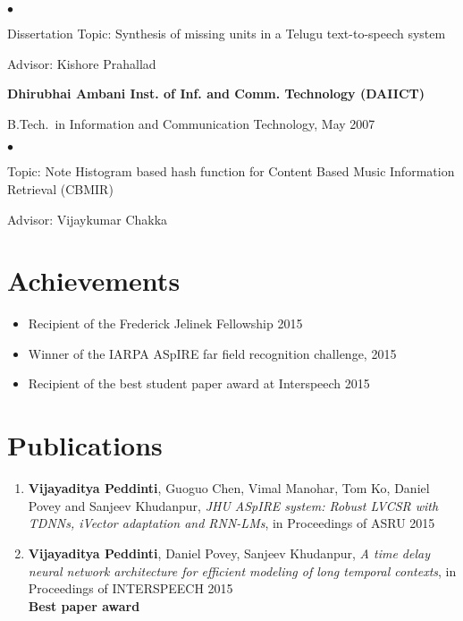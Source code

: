 \documentclass[margin,line,pifont,palatino,courier]{res}
\newenvironment{list1}{
  \begin{list}{\ding{113}}{%
      \setlength{\itemsep}{0in}
      \setlength{\parsep}{0in} \setlength{\parskip}{0in}
      \setlength{\topsep}{0in} \setlength{\partopsep}{0in}
      \setlength{\leftmargin}{0.17in}}}{\end{list}}
\newenvironment{list2}{
  \begin{list}{$\bullet$}{%
      \setlength{\itemsep}{0in}
      \setlength{\parsep}{0in} \setlength{\parskip}{0in}
      \setlength{\topsep}{0in} \setlength{\partopsep}{0in}
      \setlength{\leftmargin}{0.2in}}}{\end{list}}
\begin{document}
\begin{resume}
\begin{list1}
\begin{list2}
\vspace*{.05in}
\item Dissertation Topic:  Synthesis of missing units in a Telugu text-to-speech system 
\item Advisor: Kishore Prahallad
\end{list2}
\end{list1}

{\bf Dhirubhai Ambani Inst. of Inf. and Comm. Technology (DAIICT)}\\
\vspace*{-.1in}
\begin{list1}
\item[] B.Tech.~in Information and Communication Technology, May 2007

\begin{list2}
\vspace*{.05in}
\item Topic: Note Histogram based hash function for Content Based Music Information Retrieval (CBMIR) 
\item Advisor: Vijaykumar Chakka
\end{list2}
\end{list1}

\section{\sc Achievements}
\begin{itemize}
\item Recipient of the Frederick Jelinek Fellowship 2015
\item Winner of the IARPA ASpIRE far field recognition challenge, 2015
\item Recipient of the best student paper award at Interspeech 2015
\end{itemize}


\section{\sc Publications}
\begin{enumerate}

\item \textbf{Vijayaditya Peddinti}, Guoguo Chen, Vimal Manohar, Tom Ko, Daniel Povey and Sanjeev Khudanpur,
\textit{JHU ASpIRE system: Robust LVCSR with TDNNs, iVector adaptation and RNN-LMs}, in Proceedings of ASRU 2015\\

\item \textbf{Vijayaditya Peddinti}, Daniel Povey, Sanjeev Khudanpur,
\textit{A time delay neural network architecture for efficient modeling of long temporal contexts}, in Proceedings of INTERSPEECH 2015\\
\textbf{Best paper award}


\end{enumerate}
\end{resume}
\end{document}
